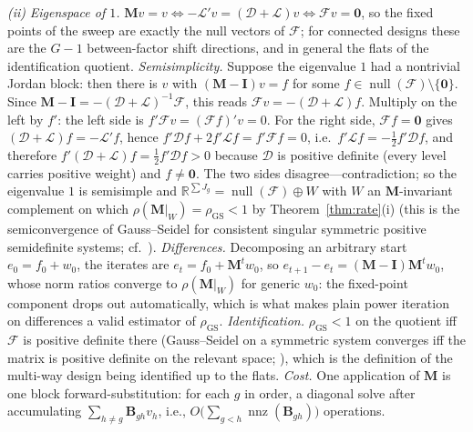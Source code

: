\documentclass[11pt]{article}
\newcommand{\R}{\mathbb{R}}
\newcommand{\bB}{\mathbf{B}}
\newcommand{\bI}{\mathbf{I}}
\newcommand{\bzero}{\mathbf{0}}
\begin{document}
\emph{(ii)}  \emph{Eigenspace of $1$.}  $\mathbf{M}v = v \iff
-\mathcal{L}'v = (\mathcal{D} + \mathcal{L})v \iff \mathcal{F}v =
\bzero$, so the fixed points of the sweep are exactly the null vectors
of $\mathcal{F}$; for connected designs these are the $G - 1$
between-factor shift directions, and in general the flats of the
identification quotient.  \emph{Semisimplicity.}  Suppose the eigenvalue
$1$ had a nontrivial Jordan block: then there is $v$ with
$(\mathbf{M} - \bI)v = f$ for some $f \in
\operatorname{null}(\mathcal{F}) \setminus \{\bzero\}$.  Since
$\mathbf{M} - \bI = -(\mathcal{D} + \mathcal{L})^{-1}\mathcal{F}$, this
reads $\mathcal{F}v = -(\mathcal{D} + \mathcal{L})f$.  Multiply on the
left by $f'$: the left side is $f'\mathcal{F}v = (\mathcal{F}f)'v = 0$.
For the right side, $\mathcal{F}f = \bzero$ gives
$(\mathcal{D} + \mathcal{L})f = -\mathcal{L}'f$, hence
$f'\mathcal{D}f + 2f'\mathcal{L}f = f'\mathcal{F}f = 0$, i.e.\
$f'\mathcal{L}f = -\tfrac12 f'\mathcal{D}f$, and therefore
$f'(\mathcal{D} + \mathcal{L})f = \tfrac12 f'\mathcal{D}f > 0$ because
$\mathcal{D}$ is positive definite (every level carries positive
weight) and $f \ne \bzero$.  The two sides disagree---contradiction; so
the eigenvalue $1$ is semisimple and $\R^{\sum J_g} =
\operatorname{null}(\mathcal{F}) \oplus W$ with $W$ an
$\mathbf{M}$-invariant complement on which
$\rho(\mathbf{M}|_W) = \rho_{\mathrm{GS}} < 1$ by
Theorem~\ref{thm:rate}(i) (this is the semiconvergence of Gauss--Seidel
for consistent singular symmetric positive semidefinite systems; cf.\
\citealp{keller1965,berman1994}).  \emph{Differences.}  Decomposing an
arbitrary start $e_0 = f_0 + w_0$, the iterates are $e_t = f_0 +
\mathbf{M}^t w_0$, so $e_{t+1} - e_t = (\mathbf{M} -
\bI)\mathbf{M}^t w_0$, whose norm ratios converge to
$\rho(\mathbf{M}|_W)$ for generic $w_0$: the fixed-point component drops
out automatically, which is what makes plain power iteration on
differences a valid estimator of $\rho_{\mathrm{GS}}$.
\emph{Identification.}  $\rho_{\mathrm{GS}} < 1$ on the quotient iff
$\mathcal{F}$ is positive definite there (Gauss--Seidel on a symmetric
system converges iff the matrix is positive definite on the relevant
space; \citealp[Sec.~11.2]{golub2013}), which is the definition of the
multi-way design being identified up to the flats.  \emph{Cost.}  One
application of $\mathbf{M}$ is one block forward-substitution: for each
$g$ in order, a diagonal solve after accumulating
$\sum_{h \ne g} \bB_{gh} v_h$, i.e., $O\big(\sum_{g<h}
\operatorname{nnz}(\bB_{gh})\big)$ operations.
\end{document}
